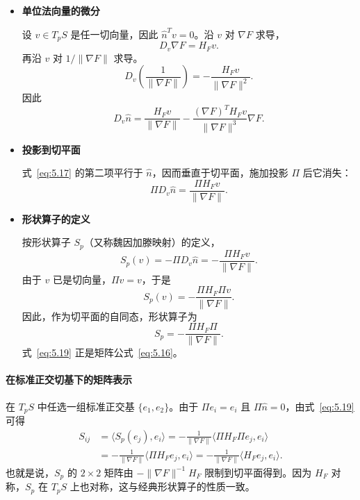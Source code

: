 \begin{itemize}
  \item \textbf{单位法向量的微分}

  设 $v\in T_pS$ 是任一切向量，因此 $\hat n^Tv=0$。沿 $v$ 对 $\nabla F$ 求导，
  \[
    D_v\nabla F=H_Fv.
  \]
  再沿 $v$ 对 $1/\lVert\nabla F\rVert$ 求导。
  \[
    D_v\left(\frac1{\lVert\nabla F\rVert}\right)
      =-\frac{H_Fv}{\lVert\nabla F\rVert^2}.
  \]
  因此
  \begin{equation*}
    D_v\hat n=\frac{H_Fv}{\lVert\nabla F\rVert}
      -\frac{(\nabla F)^TH_Fv}{\lVert\nabla F\rVert^3}\nabla F.
    \tag{5.17}\label{eq:5.17}
  \end{equation*}
  \item \textbf{投影到切平面}

  式~\eqref{eq:5.17} 的第二项平行于 $\hat n$，因而垂直于切平面，施加投影 $\Pi$ 后它消失：
  \begin{equation*}
    \Pi D_v\hat n=\frac{\Pi H_Fv}{\lVert\nabla F\rVert}.
    \tag{5.18}\label{eq:5.18}
  \end{equation*}
  \item \textbf{形状算子的定义}

  按形状算子 $S_p$（又称魏因加滕映射）的定义，
  \[
    S_p(v)=-\Pi D_v\hat n=-\frac{\Pi H_Fv}{\lVert\nabla F\rVert}.
  \]
  由于 $v$ 已是切向量，$\Pi v=v$，于是
  \[
    S_p(v)=-\frac{\Pi H_F\Pi v}{\lVert\nabla F\rVert}.
  \]
  因此，作为切平面的自同态，形状算子为
  \begin{equation*}
    S_p=-\frac{\Pi H_F\Pi}{\lVert\nabla F\rVert}.
    \tag{5.19}\label{eq:5.19}
  \end{equation*}
  式~\eqref{eq:5.19} 正是矩阵公式~\eqref{eq:5.16}。
\end{itemize}

\paragraph{在标准正交切基下的矩阵表示}
在 $T_pS$ 中任选一组标准正交基 $\{e_1,e_2\}$。由于 $\Pi e_i=e_i$ 且 $\Pi\hat n=0$，由式~\eqref{eq:5.19} 可得
\[
  \begin{aligned}
    S_{ij}&=\langle S_p(e_j),e_i\rangle
       =-\frac{1}{\lVert\nabla F\rVert}\langle\Pi H_F\Pi e_j,e_i\rangle\\
      &=-\frac{1}{\lVert\nabla F\rVert}\langle\Pi H_Fe_j,e_i\rangle
       =-\frac{1}{\lVert\nabla F\rVert}\langle H_Fe_j,e_i\rangle.
  \end{aligned}
\]
也就是说，$S_p$ 的 $2\times2$ 矩阵由 $-\lVert\nabla F\rVert^{-1}H_F$ 限制到切平面得到。因为 $H_F$ 对称，$S_p$ 在 $T_pS$ 上也对称，这与经典形状算子的性质一致。


